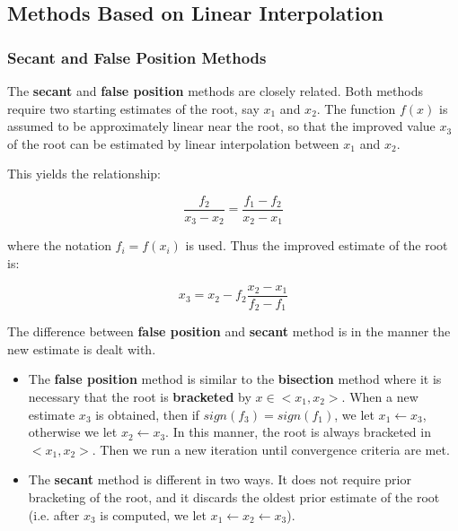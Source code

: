 \subsection{Methods Based on Linear Interpolation}

\subsubsection{Secant and False Position Methods}

The \textbf{secant} and \textbf{false position} methods are closely related.
Both methods require two starting estimates of the root, say $ x_1 $ and $ x_2 $.
The function $ f(x) $ is assumed to be approximately linear near the root, so
that the improved value $ x_3 $ of the root can be estimated by linear interpolation
between $ x_1 $ and $ x_2 $.

This yields the relationship:

\begin{equation}
    \frac{f_2}{x_3 - x_2} = \frac{f_1 - f_2}{x_2 - x_1}
\end{equation}

where the notation $ f_i = f(x_i) $ is used. Thus the improved estimate of the
root is:

\begin{equation}
    x_3 = x_2 - f_2 \frac{x_2 - x_1}{f_2 - f_1}
\end{equation}

The difference between \textbf{false position} and \textbf{secant} method is in
the manner the new estimate is dealt with.

\begin{itemize}
    \item The \textbf{false position} method is similar to the \textbf{bisection} method where
        it is necessary that the root is \textbf{bracketed} by $ x \in <x_1, x_2> $.
        When a new estimate $ x_3 $ is obtained, then if $ sign(f_3) = sign(f_1) $,
        we let $ x_1 \leftarrow x_3 $, otherwise we let $ x_2 \leftarrow x_3 $.
        In this manner, the root is always bracketed in $ <x_1, x_2> $.
        Then we run a new iteration until convergence criteria are met.

    \item The \textbf{secant} method is different in two ways. It does not require prior
        bracketing of the root, and it discards the oldest prior estimate of the
        root (i.e. after $ x_3 $ is computed, we let $ x_1 \leftarrow x_2 \leftarrow x_3 $).

\end{itemize}

